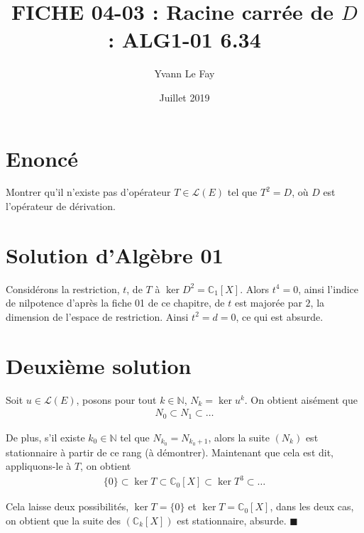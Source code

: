 \documentclass{article}
\newcommand*{\QED}{\hfill\ensuremath{\blacksquare}}%
\begin{document}
\title{FICHE 04-03 : Racine carrée de $D$ : ALG1-01 6.34}
\author{Yvann Le Fay}
\date{Juillet 2019}
\maketitle
\section*{Enoncé}
Montrer qu'il n'existe pas d'opérateur $T\in \mathcal{L}(E)$ tel que $T^2 = D$, où $D$ est l'opérateur de dérivation.
\section*{Solution d'Algèbre 01}
Considérons la restriction, $t$, de $T$ à $\ker D^2 = \mathbb{C}_1[X]$. Alors $t^4=0$, ainsi l'indice de nilpotence d'après la fiche 01 de ce chapitre, de $t$ est majorée par $2$, la dimension de l'espace de restriction. Ainsi $t^2 = d = 0$, ce qui est absurde.
\section*{Deuxième solution}
Soit $u\in\mathcal{L}(E)$, posons pour tout $k\in\mathbb{N}$, $N_k = \ker u^k$. On obtient aisément que
\begin{align*}
N_0\subset N_1\subset \ldots
\end{align*}

De plus, s'il existe $k_0\in\mathbb{N}$ tel que $N_{k_0}=N_{k_0+1}$, alors la suite $(N_k)$ est stationnaire à partir de ce rang (à démontrer). Maintenant que cela est dit, appliquons-le à $T$, on obtient
\begin{align*}
\{0\}\subset \ker T\subset \mathbb{C}_0[X]\subset \ker T^3 \subset \ldots
\end{align*}

Cela laisse deux possibilités, $\ker T = \{0\}$ et $\ker T = \mathbb{C}_0[X]$, dans les deux cas, on obtient que la suite des $(\mathbb{C}_k[X])$ est stationnaire, absurde.
\QED
\end{document}
